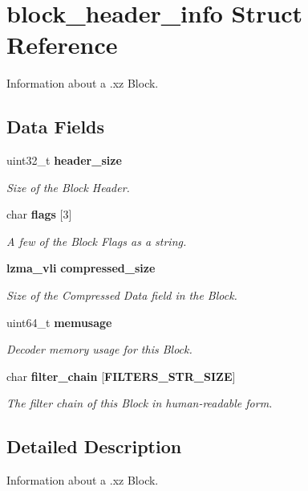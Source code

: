 \section{block\-\_\-header\-\_\-info Struct Reference}
\label{structblock__header__info}


Information about a .xz Block.  


\subsection*{Data Fields}
\begin{DoxyCompactItemize}
\item 
uint32\-\_\-t {\bf header\-\_\-size}
\begin{DoxyCompactList}\small\item\em Size of the Block Header. \end{DoxyCompactList}\item 
char {\bf flags} [3]
\begin{DoxyCompactList}\small\item\em A few of the Block Flags as a string. \end{DoxyCompactList}\item 
{\bf lzma\-\_\-vli} {\bf compressed\-\_\-size}
\begin{DoxyCompactList}\small\item\em Size of the Compressed Data field in the Block. \end{DoxyCompactList}\item 
uint64\-\_\-t {\bf memusage}
\begin{DoxyCompactList}\small\item\em Decoder memory usage for this Block. \end{DoxyCompactList}\item 
char {\bf filter\-\_\-chain} [{\bf F\-I\-L\-T\-E\-R\-S\-\_\-\-S\-T\-R\-\_\-\-S\-I\-Z\-E}]
\begin{DoxyCompactList}\small\item\em The filter chain of this Block in human-\/readable form. \end{DoxyCompactList}\end{DoxyCompactItemize}


\subsection{Detailed Description}
Information about a .xz Block. 

